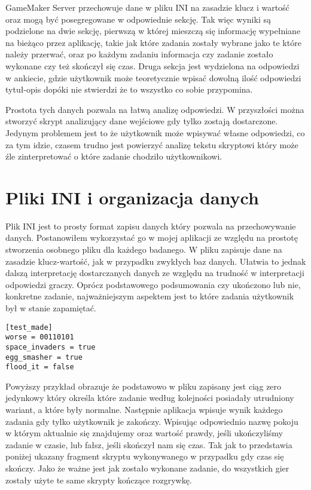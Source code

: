 \documentclass[openright]{xmgr}
\begin{document}
GameMaker Server przechowuje dane w pliku INI na zasadzie klucz i wartość oraz mogą być posegregowane w odpowiednie sekcję. Tak więc wyniki są podzielone na dwie sekcję, pierwszą w której mieszczą się informację wypełniane na bieżąco przez aplikację, takie jak które zadania zostały wybrane jako te które należy przerwać, oraz po każdym zadaniu informacja czy zadanie zostało wykonane czy też skończył się czas. Druga sekcja jest wydzielona na odpowiedzi w ankiecie, gdzie użytkownik może teoretycznie wpisać dowolną ilość odpowiedzi tytuł-opis dopóki nie stwierdzi że to wszystko co sobie przypomina.

Prostota tych danych pozwala na łatwą analizę odpowiedzi. W przyszłości można stworzyć skrypt analizujący dane wejściowe gdy tylko zostają dostarczone. Jedynym problemem jest to że użytkownik może wpisywać własne odpowiedzi, co za tym idzie, czasem trudno jest powierzyć analizę tekstu skryptowi który może źle zinterpretować o które zadanie chodziło użytkownikowi.

\section{Pliki INI i organizacja danych}
Plik INI jest to prosty format zapisu danych który pozwala na przechowywanie danych. Postanowiłem wykorzystać go w mojej aplikacji ze względu na prostotę stworzenia osobnego pliku dla każdego badanego. W pliku zapisuje dane na zasadzie klucz-wartość, jak w przypadku zwykłych baz danych. Ułatwia to jednak dalszą interpretację dostarczanych danych ze względu na trudność w interpretacji odpowiedzi graczy. Oprócz podstawowego podsumowania czy ukończono lub nie, konkretne zadanie, najważniejszym aspektem jest to które zadania użytkownik był w stanie zapamiętać.

\begin{lstlisting}[caption={Fragment pliku INI}]
[test_made]
worse = 00110101
space_invaders = true
egg_smasher = true
flood_it = false
\end{lstlisting}

Powyższy przykład obrazuje że podstawowo w pliku zapisany jest ciąg zero jedynkowy który określa które zadanie według kolejności posiadały utrudniony wariant, a które były normalne. Następnie aplikacja wpisuje wynik każdego zadania gdy tylko użytkownik je zakończy. Wpisując odpowiednio nazwę pokoju w którym aktualnie się znajdujemy oraz wartość prawdy, jeśli ukończyliśmy zadanie w czasie, lub fałsz, jeśli skończył nam się czas. Tak jak to przedstawia poniżej ukazany fragment skryptu wykonywanego w przypadku gdy czas się skończy. Jako że ważne jest jak zostało wykonane zadanie, do wszystkich gier zostały użyte te same skrypty kończące rozgrywkę.  
\end{document}
